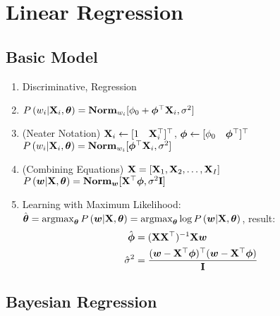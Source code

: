 
\chapter{Linear Regression}
\label{chapter6}

\section{Basic Model}
\begin{enumerate}
	\item Discriminative, Regression
	\item $P\left(w_i|\mathbf{X}_i,\boldsymbol{\theta}\right)=\mathbf{Norm}_{w_i}[\phi_0+\boldsymbol{\phi}{}^\top\mathbf{X}_i,\sigma^2]$
	\item (Neater Notation) $\mathbf{X}_i\gets[1\quad\mathbf{X}{}^\top_i]{}^\top$, $\boldsymbol{\phi}\gets[\phi_0\quad\boldsymbol{\phi}{}^\top]{}^\top$ \\ $P\left(w_i|\mathbf{X}_i,\boldsymbol{\theta}\right)=\mathbf{Norm}_{w_i}[\boldsymbol{\phi}{}^\top\mathbf{X}_i,\sigma^2]$
	\item (Combining Equations) $\mathbf{X}=[\mathbf{X}_1,\mathbf{X}_2,\dotsc,\mathbf{X}_I]$ \\ $P\left(\boldsymbol{w}|\mathbf{X},\boldsymbol{\theta}\right)=\mathbf{Norm}_{\boldsymbol{w}}[\mathbf{X}{}^\top\boldsymbol{\phi},\sigma^2\mathbf{I}]$
	\item Learning with Maximum Likelihood: $\hat{\vec{\th}}=\argmax_{\vec{\th}}\P{\vec{w}|\mat{X},\vec{\th}}=\argmax_{\vec{\th}}\log\P{\vec{w}|\mat{X},\vec{\th}}$, result:
	\begin{align*}
	\hat{\boldsymbol{\phi}}&=(\mathbf{X}\mathbf{X}{}^\top)^{-1}\mathbf{X}\boldsymbol{w} \\
	\hat{\sigma}^2&=\frac{(\boldsymbol{w}-\mathbf{X}{}^\top\boldsymbol{\phi}){}^\top(\boldsymbol{w}-\mathbf{X}{}^\top\boldsymbol{\phi})}{\mathbf{I}}
	\end{align*}
\end{enumerate}

\section{Bayesian Regression}

